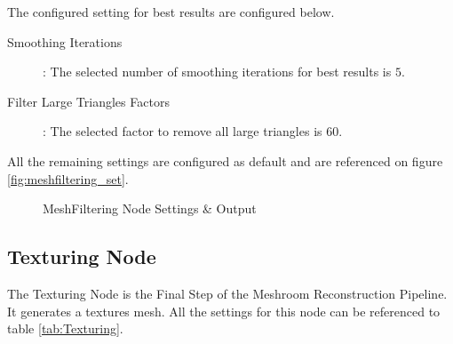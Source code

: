 \documentclass[12pt]{report}
\begin{document}
The configured setting for best results are configured below.

\begin{description}
  \item[Smoothing Iterations]: The selected number of smoothing iterations for best results is $5$.
  \item[Filter Large Triangles Factors]: The selected factor to remove all large triangles is $60$.  
\end{description}


All the remaining settings are configured as default and are referenced on figure \ref{fig:meshfiltering_set}.
\begin{figure}[H]%
  \centering
  \qquad
\caption{MeshFiltering Node Settings \& Output}
\label{fig:MeshFiltering_settings} 
\end{figure}



\subsection*{Texturing Node}
The Texturing Node is the Final Step of the Meshroom Reconstruction Pipeline. It generates a textures mesh. 
All the settings for this node can be referenced to table \ref{tab:Texturing}.
\end{document}

